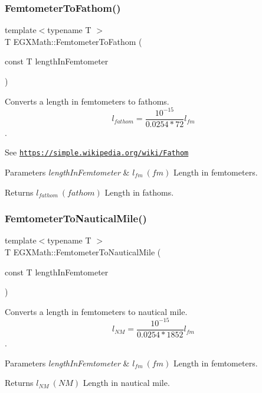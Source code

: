 \subsubsection{\texorpdfstring{Femtometer\+To\+Fathom()}{FemtometerToFathom()}}
{\footnotesize\ttfamily template$<$typename T $>$ \\
T E\+G\+X\+Math\+::\+Femtometer\+To\+Fathom (\begin{DoxyParamCaption}\item[{const T}]{length\+In\+Femtometer }\end{DoxyParamCaption})}



Converts a length in femtometers to fathoms. \[ l_{fathom}= \frac{10^{-15}}{0.0254 * 72} l_{fm} \]. 

See \href{https://simple.wikipedia.org/wiki/Fathom}{\tt https\+://simple.\+wikipedia.\+org/wiki/\+Fathom} 
\begin{DoxyParams}{Parameters}
{\em length\+In\+Femtometer} & $ l_{fm}\ (fm)$ Length in femtometers. \\
\hline
\end{DoxyParams}
\begin{DoxyReturn}{Returns}
$ l_{fathom}\ (fathom)$ Length in fathoms. 
\end{DoxyReturn}
\mbox{\label{group___e_g_x_math-_conversions-_length_conversions-_femtometer-_nautical_gae44357e3e44868120d603cff76cefd77}} 
\subsubsection{\texorpdfstring{Femtometer\+To\+Nautical\+Mile()}{FemtometerToNauticalMile()}}
{\footnotesize\ttfamily template$<$typename T $>$ \\
T E\+G\+X\+Math\+::\+Femtometer\+To\+Nautical\+Mile (\begin{DoxyParamCaption}\item[{const T}]{length\+In\+Femtometer }\end{DoxyParamCaption})}



Converts a length in femtometers to nautical mile. \[ l_{NM}= \frac{10^{-15}}{0.0254 * 1852} l_{fm} \]. 


\begin{DoxyParams}{Parameters}
{\em length\+In\+Femtometer} & $ l_{fm}\ (fm)$ Length in femtometers. \\
\hline
\end{DoxyParams}
\begin{DoxyReturn}{Returns}
$ l_{NM}\ (NM)$ Length in nautical mile. 
\end{DoxyReturn}
